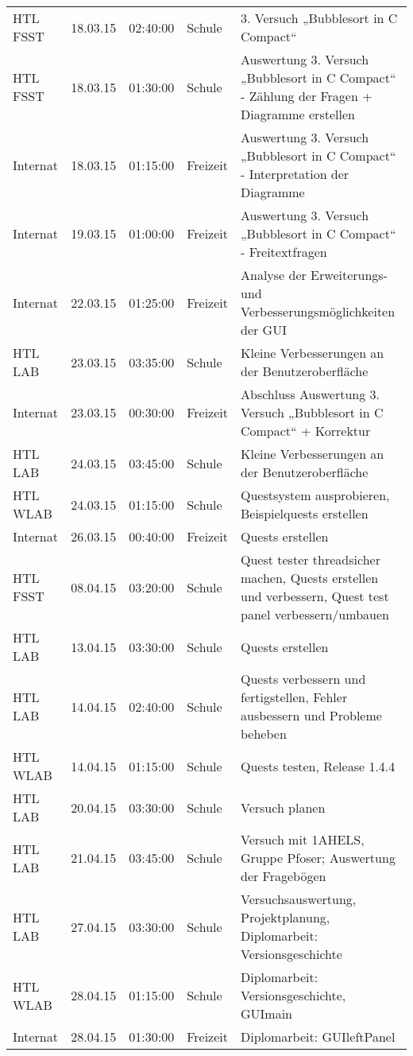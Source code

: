 \begin{small}
\begin{longtable}{ p{} p{} p{} p{} p{}}
HTL FSST	& 18.03.15	& 02:40:00	& Schule	& 3. Versuch „Bubblesort in C Compact“ \\
HTL FSST	& 18.03.15	& 01:30:00	& Schule	& Auswertung 3. Versuch „Bubblesort in C Compact“ - Z\"ahlung der Fragen + Diagramme erstellen \\
Internat	& 18.03.15	& 01:15:00	& Freizeit	& Auswertung 3. Versuch „Bubblesort in C Compact“ - Interpretation der Diagramme \\
Internat	& 19.03.15	& 01:00:00	& Freizeit	& Auswertung 3. Versuch „Bubblesort in C Compact“ - Freitextfragen \\
Internat	& 22.03.15	& 01:25:00	& Freizeit	& Analyse der Erweiterungs- und Verbesserungsm\"oglichkeiten der GUI \\
HTL LAB	& 23.03.15	& 03:35:00	& Schule	& Kleine Verbesserungen an der Benutzeroberfl\"ache \\
Internat	& 23.03.15	& 00:30:00	& Freizeit	& Abschluss Auswertung 3. Versuch „Bubblesort in C Compact“ + Korrektur \\
HTL LAB	& 24.03.15	& 03:45:00	& Schule	& Kleine Verbesserungen an der Benutzeroberfl\"ache \\
HTL WLAB	& 24.03.15	& 01:15:00	& Schule	& Questsystem ausprobieren, Beispielquests erstellen \\
Internat	& 26.03.15	& 00:40:00	& Freizeit	& Quests erstellen \\
HTL FSST	& 08.04.15	& 03:20:00	& Schule	& Quest tester threadsicher machen, Quests erstellen und verbessern, Quest test panel verbessern/umbauen \\
HTL LAB	& 13.04.15	& 03:30:00	& Schule	& Quests erstellen \\
HTL LAB	& 14.04.15	& 02:40:00	& Schule	& Quests verbessern und fertigstellen, Fehler ausbessern und Probleme beheben \\
HTL WLAB	& 14.04.15	& 01:15:00	& Schule	& Quests testen, Release 1.4.4 \\
HTL LAB	& 20.04.15	& 03:30:00	& Schule	& Versuch planen \\
HTL LAB	& 21.04.15	& 03:45:00	& Schule	& Versuch mit 1AHELS, Gruppe Pfoser; Auswertung der Frageb\"ogen \\
HTL LAB	& 27.04.15	& 03:30:00	& Schule	& Versuchsauswertung, Projektplanung, Diplomarbeit: Versionsgeschichte \\
HTL WLAB	& 28.04.15	& 01:15:00	& Schule	& Diplomarbeit: Versionsgeschichte, GUImain \\
Internat	& 28.04.15	& 01:30:00	& Freizeit	& Diplomarbeit: GUIleftPanel \\

\end{longtable}
\end{small}
